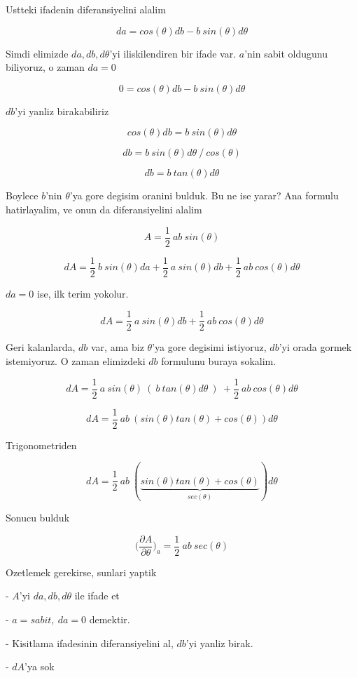 \documentclass[12pt,fleqn]{article}\usepackage{../common}
\begin{document}
Ustteki ifadenin diferansiyelini alalim

\[ da = cos(\theta) db - b \ sin(\theta) d\theta \]

Simdi elimizde $da,db,d\theta$'yi iliskilendiren bir ifade var. $a$'nin
sabit oldugunu biliyoruz, o zaman $da=0$

\[ 0 = cos(\theta) db - b \ sin(\theta) d\theta \]

$db$'yi yanliz birakabiliriz

\[ cos(\theta) db = b \ sin(\theta) d\theta \]

\[ db = b \ sin(\theta) d\theta \ / \ cos(\theta) \]

\[ db = b \ tan(\theta) d\theta  \]

Boylece $b$'nin $\theta$'ya gore degisim oranini bulduk. Bu ne ise yarar?
Ana formulu hatirlayalim, ve onun da diferansiyelini alalim

\[ A = \frac{1}{2} \ ab \ sin(\theta) \]

\[ dA = \frac{1}{2} \ b \ sin(\theta) da + 
\frac{1}{2} \ a \ sin(\theta) db + 
\frac{1}{2} \ ab \ cos(\theta)d\theta
 \]

$da = 0$ ise, ilk terim yokolur. 

\[ dA = 
\frac{1}{2} \ a \ sin(\theta) db + 
\frac{1}{2} \ ab \ cos(\theta)d\theta
 \]

Geri kalanlarda, $db$ var, ama biz $\theta$'ya gore degisimi istiyoruz,
$db$'yi orada gormek istemiyoruz. O zaman elimizdeki $db$ formulunu buraya
sokalim. 

\[ dA =  
\frac{1}{2} \ a \ sin(\theta) \ ( \ b \ tan(\theta) d\theta \ ) \ + 
\frac{1}{2} \ ab \ cos(\theta)d\theta
\]

\[ dA =  
\frac{1}{2} \ ab \ (sin(\theta) tan(\theta) +  cos (\theta) )d\theta
\]

Trigonometriden 

\[ dA =  
\frac{1}{2} \ ab \ (
\underbrace{sin(\theta) tan(\theta) +  cos (\theta)}_{sec(\theta)}
)d\theta
\]

Sonucu bulduk 

\[ \bigg( \frac{\partial A}{\partial \theta} \bigg)_{a} = 
\frac{1}{2} \ ab \ sec(\theta)
 \]

Ozetlemek gerekirse, sunlari yaptik

- $A$'yi $da,db,d\theta$ ile ifade et

- $a=sabit, \ da=0$ demektir.

- Kisitlama ifadesinin diferansiyelini al, $db$'yi yanliz birak. 

- $dA$'ya sok
\end{document}
